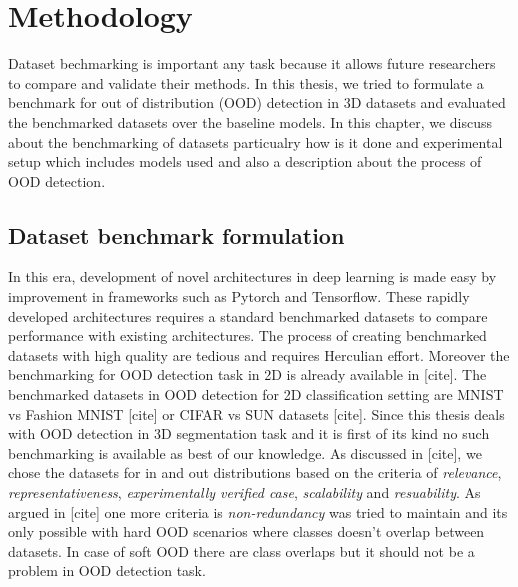 
\chapter{Methodology}

Dataset bechmarking is important any task because it allows future researchers to compare and validate their methods.
In this thesis, we tried to formulate a benchmark for out of distribution (OOD) detection in 3D datasets and evaluated the benchmarked datasets over the baseline models.
In this chapter, we discuss about the benchmarking of datasets particualry how is it done and experimental setup which includes models used and also a description about the process of OOD detection.

\section{Dataset benchmark formulation}
In this era, development of novel architectures in deep learning is made easy by improvement in frameworks such as Pytorch and Tensorflow. 
These rapidly developed architectures requires a standard benchmarked datasets to compare performance with existing architectures.
The process of creating benchmarked datasets with high quality are tedious and requires Herculian effort. 
Moreover the benchmarking for OOD detection task in 2D is already available in [cite]. 
The benchmarked datasets in OOD detection for 2D classification setting are MNIST vs Fashion MNIST [cite] or CIFAR vs SUN datasets [cite].
Since this thesis deals with OOD detection in 3D segmentation task and it is first of its kind no such benchmarking is available as best of our knowledge.
As discussed in [cite], we chose the datasets for in and out distributions based on the criteria of \textit{relevance}, \textit{representativeness}, \textit{experimentally verified case}, \textit{scalability} and \textit{resuability}.
As argued in [cite] one more criteria is \textit{non-redundancy} was tried to maintain and its only possible with hard OOD scenarios where classes doesn't overlap between datasets. 
In case of soft OOD there are class overlaps but it should not be a problem in OOD detection task.

